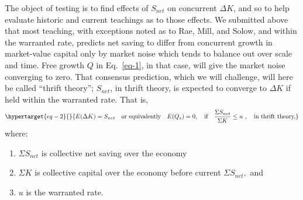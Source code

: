 The object of testing is to find effects of \(S_{net}\) on concurrent
\(\Delta K\), and so to help evaluate historic and current teachings as
to those effects. We submitted above that most teaching, with exceptions
noted as to Rae, Mill, and Solow, and within the warranted rate,
predicts net saving to differ from concurrent growth in market-value
capital only by market noise which tends to balance out over scale and
time. Free growth \(Q\) in Eq.~\eqref{eq-1}, in that case, will give
the market noise converging to zero. That consensus prediction, which we
will challenge, will here be called ``thrift theory''; \(S_{net}\), in
thrift theory, is expected to converge to \(\Delta K\) if held within
the warranted rate. That is,
%
\begin{equation}\protect\hypertarget{eq-2}{}{
E(\Delta K) = S_{net} \quad \text{or equivalently} \quad E(Q_{s}) = 0, \quad \text{if} \quad
\frac{\Sigma S_{net}}{\Sigma K} \leq u\ ,\quad \text{in thrift theory,}
}\label{eq-2}\end{equation}
%
where:

\begin{enumerate}
\def\labelenumi{\arabic{enumi}.}
\item
  \(\Sigma S_{net}\) is collective net saving over the economy
\item
  \(\Sigma K\) is collective capital over the economy before current
  \(\Sigma S_{net},\) and
\item
  \(u\) is the warranted rate.
\end{enumerate}

